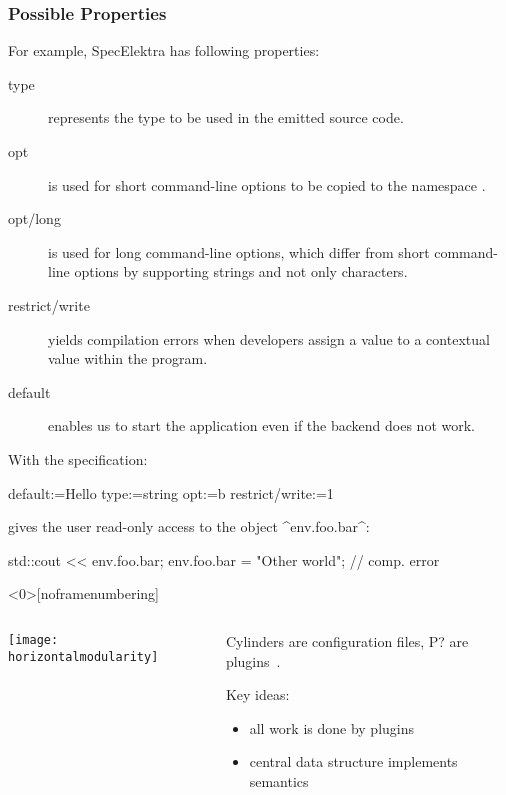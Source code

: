 \begin{frame}
	\frametitle{Possible Properties}
	For example, SpecElektra has following properties:
	\begin{description}
	\item[type] represents the type to be used in the emitted source code.
	\item[opt] is used for short command-line options to be copied to the namespace .
	\item[opt/long] is used for long command-line options, which differ from short command-line options by supporting strings and not only characters.
	\item[restrict/write] yields compilation errors when developers assign a value to a contextual value within the program.
	\item[default] enables us to start the application even if the backend does not work.
	\end{description}
\end{frame}

\begin{frame}[fragile]
	With the specification:
	\par
	\begin{code}
	  default:=Hello
	  type:=string
	  opt:=b
	  restrict/write:=1
	\end{code}
	\par
	 gives the user read-only access to the object ^env.foo.bar^:
	\par
	\begin{code}[language=Cpp]
	std::cout << env.foo.bar;
	env.foo.bar = "Other world"; // comp. error
	\end{code}
	\par
\end{frame}

\begin{frame}<0>[noframenumbering]
	\begin{columns}[c]
	\begin{column}{7cm}
	\texttt{[image: horizontalmodularity]}
	\end{column}
	\begin{column}{4cm}
	Cylinders are configuration files, P? are plugins~\cite{raab2016improving}.

	Key ideas:
	\begin{itemize}
	\item all work is done by plugins
	\item central data structure implements semantics
	\end{itemize}
	\end{column}
	\end{columns}
\end{frame}

